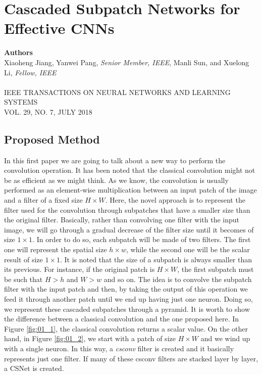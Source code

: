 \chapter{Cascaded Subpatch Networks for Effective CNNs}

{\small \textbf{Authors}\\
Xiaoheng Jiang, Yanwei Pang, \textit{Senior Member, IEEE}, Manli Sun, and Xuelong Li, \textit{Fellow, IEEE}\\ \\
IEEE TRANSACTIONS ON NEURAL NETWORKS AND LEARNING SYSTEMS\\VOL. 29, NO. 7, JULY 2018}

\section{Proposed Method}

In this first paper we are going to talk about a new way to perform the convolution operation. It has been noted that the classical convolution might not be as efficient as we might think. As we know, the convolution is usually performed as an element-wise multiplication between an input patch of the image and a filter of a fixed size $H \times W$. Here, the novel approach is to represent the filter used for the convolution through subpatches that have a smaller size than the original filter. Basically, rather than convolving one filter with the input image, we will go through a gradual decrease of the filter size until it becomes of size $1 \times 1$. In order to do so, each subpatch will be made of two filters. The first one will represent the spatial size $h \times w$, while the second one will be the scalar result of size $1 \times 1$. It is noted that the size of a subpatch is always smaller than its previous. For instance, if the original patch is $H \times W$, the first subpatch must be such that $H > h$ and $W > w$ and so on. The idea is to convolve the subpatch filter with the input patch and then, by taking the output of this operation we feed it through another patch until we end up having just one neuron. Doing so, we represent these cascaded subpatches through a pyramid. It is worth to show the difference between a classical convolution and the one proposed here. In Figure \ref{fig:01_1}, the classical convolution returns a scalar value. On the other hand, in Figure \ref{fig:01_2}, we start with a patch of size $H \times W$ and we wind up with a single neuron. In this way, a \textit{csconv} filter is created and it basically represents just one filter. If many of these csconv filters are stacked layer by layer, a CSNet is created.

